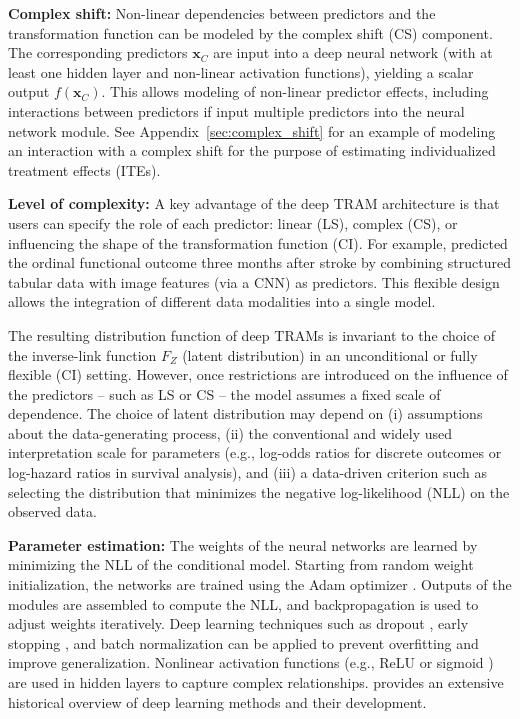 \medskip

\textbf{Complex shift:} Non-linear dependencies between predictors and the transformation function can be modeled by the complex shift (CS) component. The corresponding predictors $\mathbf{x}_{C}$ are input into a deep neural network (with at least one hidden layer and non-linear activation functions), yielding a scalar output $f(\mathbf{x}_{C})$. This allows modeling of non-linear predictor effects, including interactions between predictors if input multiple predictors into the neural network module. See Appendix~\ref{sec:complex_shift} for an example of modeling an interaction with a complex shift for the purpose of estimating individualized treatment effects (ITEs).

\medskip

\textbf{Level of complexity:} A key advantage of the deep TRAM architecture is that users can specify the role of each predictor: linear (LS), complex (CS), or influencing the shape of the transformation function (CI). For example, \citet{herzog2023} predicted the ordinal functional outcome three months after stroke by combining structured tabular data with image features (via a CNN) as predictors. This flexible design allows the integration of different data modalities into a single model.


\medskip

The resulting distribution function of deep TRAMs is invariant to the choice of the inverse-link function $F_Z$ (latent distribution) in an unconditional \citep{hothorn2018} or fully flexible (CI) setting. However, once restrictions are introduced on the influence of the predictors -- such as LS or CS -- the model assumes a fixed scale of dependence. The choice of latent distribution may depend on (i) assumptions about the data-generating process, (ii) the conventional and widely used interpretation scale for parameters (e.g., log-odds ratios for discrete outcomes or log-hazard ratios in survival analysis), and (iii) a data-driven criterion such as selecting the distribution that minimizes the negative log-likelihood (NLL) on the observed data.

%
\medskip

\textbf{Parameter estimation:} The weights of the neural networks are learned by minimizing the NLL of the conditional model. Starting from random weight initialization, the networks are trained using the Adam optimizer \citep{kingma2015}. Outputs of the modules are assembled to compute the NLL, and backpropagation \citep{rumelhart1986} is used to adjust weights iteratively. Deep learning techniques such as dropout \citep{srivastava2014}, early stopping \citep{prechelt2012}, and batch normalization \citep{Ioffe2015} can be applied to prevent overfitting and improve generalization. Nonlinear activation functions (e.g., ReLU \citealp{glorot2011} or sigmoid \citealp{rumelhart1986}) are used in hidden layers to capture complex relationships. \citet{schmidhuber2015} provides an extensive historical overview of deep learning methods and their development.




